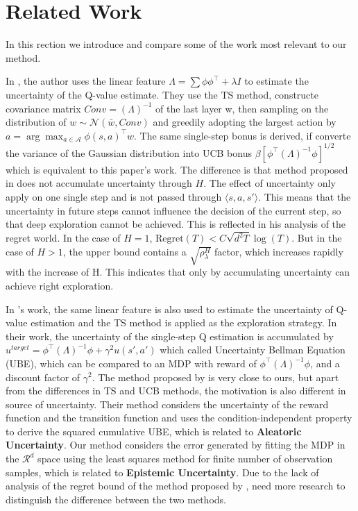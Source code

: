 \section{Related Work}
In this rection we introduce and compare some of the work most relevant to our method.

In \cite{lastLayerBayes}, the author uses the linear feature $\Lambda = \sum \phi\phi^\top+\lambda I$ to estimate the uncertainty of the Q-value estimate. They use the TS method, constructe covariance matrix $Conv=(\Lambda)^{-1}$ of the last layer w, then sampling on the distribution of $w\sim\mathcal{N}(\bar{w},Conv)$ and greedily adopting the largest action by  $a = \arg\max_{a\in\mathcal{A}}\phi(s,a)^\top w$. The same single-step bonus is derived, if converte the variance of the Gaussian distribution into UCB bonus $\beta[\phi^{\top}(\Lambda)^{-1}\phi]^{1/2}$ which is equivalent to this paper's work. The difference is that method proposed in \cite{lastLayerBayes} does not accumulate uncertainty through $H$. The effect of uncertainty only apply on one single step and is not passed through $\langle s, a, s' \rangle $. This means that the uncertainty in future steps cannot influence the decision of the current step, so that deep exploration cannot be achieved. This is reflected in his analysis of the regret world. In the case of $ H = 1 $, $ \text{Regret} (T) <C \sqrt {d ^ 2T} \log (T) $. But in the case of $ H> 1 $, the upper bound contains a $ \sqrt{\rho^H_\lambda} $ factor, which increases rapidly with the increase of H. This indicates that only by accumulating uncertainty can achieve right exploration.

In \cite{UBE} 's work, the same linear feature is also used to estimate the uncertainty of Q-value estimation and the TS method is applied as the exploration strategy. In their work, the uncertainty of the single-step Q estimation is accumulated by $ u^{target} = \phi ^ {\top} (\Lambda) ^ {-1} \phi + \gamma ^ 2 u (s ', a') $  which called Uncertainty Bellman 
Equation (UBE), which can be compared to an MDP with reward of $ \phi ^ {\top} (\Lambda) ^ {-1} \phi $, and a discount factor of $ \gamma ^ 2 $. The method proposed by \cite{UBE} is very close to ours, but apart from the differences in TS and UCB methods, the motivation is also different in source of uncertainty. Their method considers the uncertainty of the reward function and the transition function and uses the condition-independent property to derive the squared cumulative UBE, which is related to \textbf{Aleatoric Uncertainty}. Our method considers the error generated by fitting the MDP in the $\mathcal{R}^d$ space using the least squares method for finite number of observation samples, which is related to \textbf{Epistemic Uncertainty}. Due to the lack of analysis of the regret bound of the method proposed by \cite{UBE}, need more research to distinguish the difference between the two methods.

